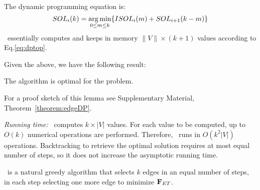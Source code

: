 The dynamic programming equation is: 
\begin{equation}
	SOL_i(k) = \operatorname*{arg\,min}_{0\leq m\leq k}\{ISOL_i(m) + SOL_{i+1}(k - m)\}
	\label{eq:dptop}
\end{equation}
\edgeDP\ essentially computes and keeps in memory 
$\|V\| \times (k+1)$ values according to Eq.\eqref{eq:dptop}.

Given the above, we have the following result:

\begin{lemma}
The {\edgeDP} algorithm is optimal for the {\edgeproblem} problem.
\end{lemma}


For a proof sketch of this lemma see Supplementary Material, 
Theorem~\ref{theorem:edgeDP}.


\emph{Running time:} \edgeDP\ 
computes $k\times |V|$ values. For each value to be
computed, up to $O(k)$ numerical operations are performed. Therefore,
\edgeDP\ runs in $O(k^2|V|)$ operations. Backtracking to retrieve the
optimal solution requires at most equal number of steps, so it does not
increase the asymptotic running time.





\edgegreedy\ is a natural greedy algorithm that selects
$k$ edges in an equal number of steps, in each step selecting
one more edge to minimize $\mathbf{F}_{{\sc ET}}$.




